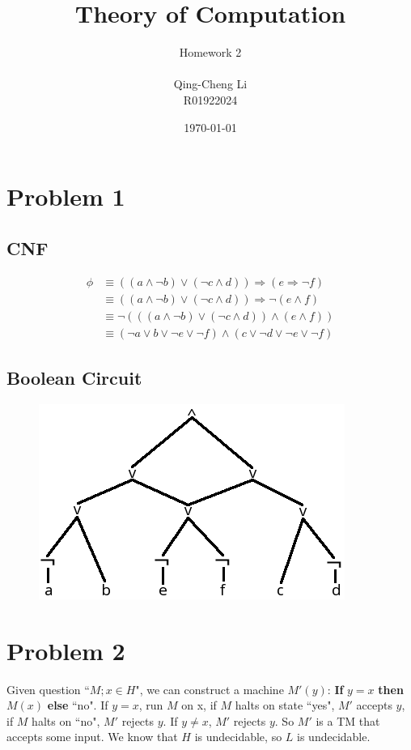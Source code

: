 \documentclass[11pt]{article}
\title{\textbf{Theory of Computation}}
\author{Homework 2\\
					\\
		Qing-Cheng Li\\
		R01922024}
\date{\today}
\begin{document}
\maketitle
\section{Problem 1}
\subsection{CNF}
\begin{align*}
 \phi &\equiv ((a \wedge \neg b ) \vee (\neg c \wedge d)) \Rightarrow (e \Rightarrow \neg f) \\
 &\equiv ((a \wedge \neg b ) \vee (\neg c \wedge d)) \Rightarrow \neg (e \wedge f) \\
 &\equiv \neg (((a \wedge \neg b ) \vee (\neg c \wedge d)) \wedge (e \wedge f)) \\
 &\equiv (\neg a \vee b \vee \neg e \vee \neg f) \wedge (c \vee \neg d \vee \neg e \vee \neg f)
\end{align*}

\subsection{Boolean Circuit}
\begin{figure}[htp]
\centering
\includegraphics[scale=0.3]{hw2_boolean_circuit.png}
\label{}
\end{figure}

\section{Problem 2}
Given question ``$M;x \in H$", we can construct a machine $M'(y)$: \textbf{If} $y = x$ \textbf{then} $M(x)$ \textbf{else} ``no". If $y = x$, run $M$ on x, if $M$ halts on state ``yes", $M'$ accepts $y$, if $M$ halts on ``no", $M'$ rejects $y$. If $y \neq x$, $M'$ rejects $y$. So $M'$ is a TM that accepts some input. We know that $H$ is undecidable, so $L$ is undecidable. 
\end{document}
